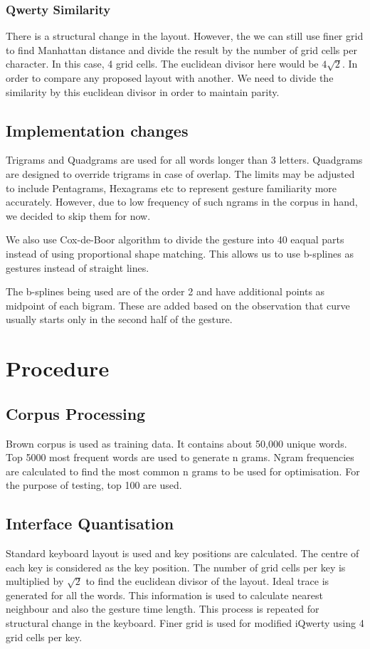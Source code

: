 \documentclass[MTech]{iitmdiss}
\begin{document}
\subsection{Qwerty Similarity}
There is a structural change in the layout. However, the we can still use finer grid to find Manhattan distance and divide the result by the number of grid cells per character. In this case, 4 grid cells. The euclidean divisor here would be $4 \sqrt{2}$. In order to compare any proposed layout with another. We need to divide the similarity by this euclidean divisor in order to maintain parity.

\section{Implementation changes}
Trigrams and Quadgrams are used for all words longer than 3 letters.
Quadgrams are designed to override trigrams in case of overlap.
The limits may be adjusted to include Pentagrams, Hexagrams etc to represent gesture familiarity more accurately. However, due to low frequency of such ngrams in the corpus in hand, we decided to skip them for now.

We also use Cox-de-Boor algorithm \cite{deboor} to divide the gesture into 40 eaqual parts instead of using proportional shape matching. This allows us to use b-splines as gestures instead of straight lines.

The b-splines being used are of the order 2 and have additional points as midpoint of each bigram. These are added based on the observation that curve usually starts only in the second half of the gesture.

\chapter{Procedure}
\section{Corpus Processing}
Brown corpus is used as training data. It contains about 50,000 unique words.
Top 5000 most frequent words are used to generate n grams.
Ngram frequencies are calculated to find the most common n grams to be used for optimisation. For the purpose of testing, top 100 are used.

\section{Interface Quantisation}
Standard keyboard layout is used and key positions are calculated.
The centre of each key is considered as the key position.
The number of grid cells per key is multiplied by $\sqrt{2}$ to find the euclidean divisor of the layout.
Ideal trace is generated for all the words. 
This information is used to calculate nearest neighbour and also the gesture time length.
This process is repeated for structural change in the keyboard. Finer grid is used for modified iQwerty using 4 grid cells per key.
\end{document}
